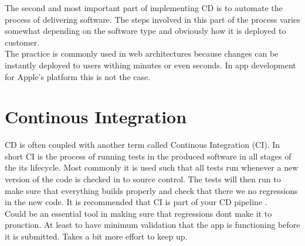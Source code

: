 \documentclass{ituthesis}
\begin{document}
The second and most important part of implementing CD is to automate the process of delivering software. The steps involved in this part of the process varies somewhat depending on the software type and obviously how it is deployed to customer.\\

The practice is commonly used in web architectures because changes can be instantly deployed to users withing minutes or even seconds. In app development for Apple's platform this is not the case. %

\section{Continous Integration}

CD is often coupled with another term called Continous Integration (CI). In short CI is the process of running tests in the produced software in all stages of the its lifecycle. Most commonly it is used such that all tests run whenever a new version of the code is checked in to source control. The tests will then run to make sure that everything builds properly and check that there we no regressions in the new code. It is recommended that CI is part of your CD pipeline \cite{Humble2010} \cite{Chen2015}.\\

Could be an essential tool in making sure that regressions dont make it to prouction.
At least to have minimum validation that the app is functioning before it is submitted.
Takes a bit more effort to keep up.







\end{document}

